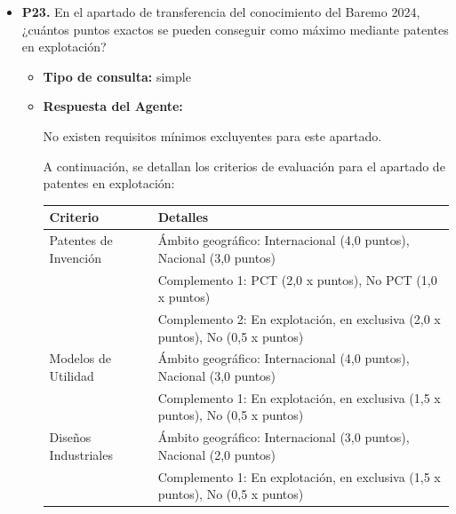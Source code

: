 \documentclass{article}
\begin{document}
\begin{itemize}
\begin{itemize}
\begin{scriptsize}
                  Revisión 3 (diciembre, 2024) 16
                \end{scriptsize}
        \end{itemize}


  \item \textbf{P23.} En el apartado de transferencia del conocimiento del Baremo 2024, ¿cuántos puntos exactos se pueden conseguir como máximo mediante patentes en explotación? \\
        \begin{itemize}
          \item \textbf{Tipo de consulta:} simple
          \item \textbf{Respuesta del Agente:}

                No existen requisitos mínimos excluyentes para este apartado.

                A continuación, se detallan los criterios de evaluación para el apartado de patentes en explotación:

                \vspace{0.4cm}
                \begin{table}[h!]\centering\renewcommand{\arraystretch}{1.3}
                  \begin{tabular}{|p{}|p{}|}\hline
                    Criterio              & Detalles                                                                      \\\hline
                    Patentes de Invención & Ámbito geográfico: Internacional (4,0 puntos), Nacional (3,0 puntos)          \\\hline
                                          & Complemento 1: PCT (2,0 x puntos), No PCT (1,0 x puntos)                      \\\hline
                                          & Complemento 2: En explotación, en exclusiva (2,0 x puntos), No (0,5 x puntos) \\\hline
                    Modelos de Utilidad   & Ámbito geográfico: Internacional (4,0 puntos), Nacional (3,0 puntos)          \\\hline
                                          & Complemento 1: En explotación, en exclusiva (1,5 x puntos), No (0,5 x puntos) \\\hline
                    Diseños Industriales  & Ámbito geográfico: Internacional (3,0 puntos), Nacional (2,0 puntos)          \\\hline
                                          & Complemento 1: En explotación, en exclusiva (1,5 x puntos), No (0,5 x puntos) \\\hline
                  \end{tabular}\end{table}
                \vspace{0.4cm}


\end{itemize}
\end{itemize}
\end{document}
